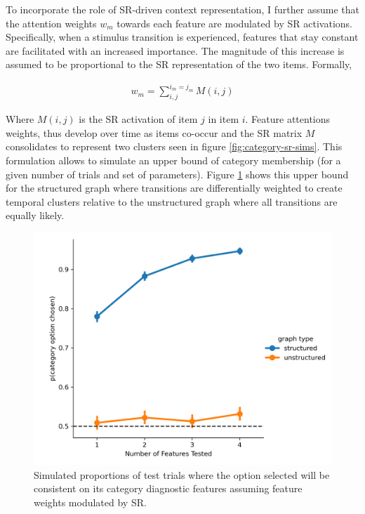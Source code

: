 To incorporate the role of SR-driven context representation, I further assume that the attention weights $w_m$ towards each feature are modulated by SR activations. Specifically, when a stimulus transition is experienced, features that stay constant are facilitated with an increased importance. The magnitude of this increase is assumed to be proportional to the SR representation of the two items. Formally, 

\begin{equation}
    \begin{aligned}
        w_m = \sum_{i, j}^{i_m = j_m} M(i, j)
    \end{aligned}
\end{equation}

Where $M(i, j)$ is the SR activation of item $j$ in item $i$. Feature attentions weights, thus develop over time as items co-occur and the SR matrix $M$ consolidates to represent two clusters seen in figure \ref{fig:category-sr-sims}. This formulation allows to simulate an upper bound of category membership (for a given number of trials and set of parameters). Figure \ref{fig:sr-cat-selection-sims} shows this upper bound for the structured graph where transitions are differentially weighted to create temporal clusters relative to the unstructured graph where all transitions are equally likely. 

\begin{figure}[ht]
    \centering
    \includegraphics[width = \textwidth]{chapter_notebooks/chapter_4/figures/cat_simulations.png}
    \caption{Simulated proportions of test trials where the option selected will be consistent on its category diagnostic features assuming feature weights modulated by SR.}
    \label{fig:sr-cat-selection-sims}
\end{figure}

